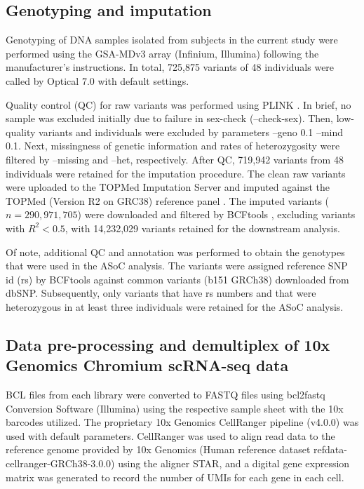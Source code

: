 \documentclass{book}
\begin{document}
\begin{refsection}
\subsection*{Genotyping and imputation}
Genotyping of DNA samples isolated from subjects in the current study were performed using the GSA-MDv3 array (Infinium, Illumina) following the manufacturer's instructions.
In total, 725,875 variants of 48 individuals were called by Optical 7.0 with default settings.

Quality control (QC) for raw variants was performed using PLINK \cite{Purcell2007PLINK}.
In brief, no sample was excluded initially due to failure in sex-check (--check-sex).
Then, low-quality variants and individuals were excluded by parameters --geno 0.1 --mind 0.1.
Next, missingness of genetic information and rates of heterozygosity were filtered by --missing and --het, respectively.
After QC, 719,942 variants from 48 individuals were retained for the imputation procedure.
The clean raw variants were uploaded to the TOPMed Imputation Server and imputed against the TOPMed (Version R2 on GRC38) reference panel \cite{Das2016Next}.
The imputed variants ($n = 290,971,705$) were downloaded and filtered by BCFtools \cite{Danecek2021Twelve}, excluding variants with $R^2 < 0.5$, with 14,232,029 variants retained for the downstream analysis.

Of note, additional QC and annotation was performed to obtain the genotypes that were used in the ASoC analysis.
The variants were assigned reference SNP id (rs) by BCFtools against common variants (b151 GRCh38) downloaded from dbSNP.
Subsequently, only variants that have rs numbers and that were heterozygous in at least three individuals were retained for the ASoC analysis.

\subsection*{Data pre-processing and demultiplex of 10x Genomics Chromium scRNA-seq data}
BCL files from each library were converted to FASTQ files using bcl2fastq Conversion Software (Illumina) using the respective sample sheet with the 10x barcodes utilized.
The proprietary 10x Genomics CellRanger pipeline (v4.0.0) was used with default parameters.
CellRanger was used to align read data to the reference genome provided by 10x Genomics (Human reference dataset refdata-cellranger-GRCh38-3.0.0) using the aligner STAR, and a digital gene expression matrix was generated to record the number of UMIs for each gene in each cell.


\end{refsection}
\end{document}
